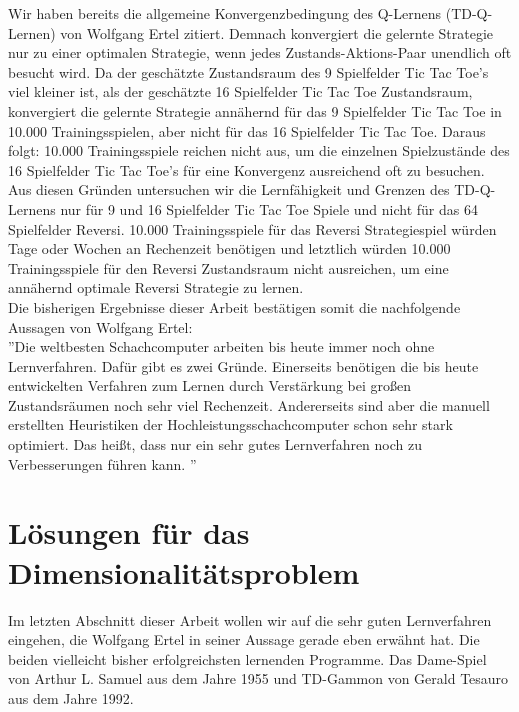 Wir haben bereits die allgemeine Konvergenzbedingung des Q-Lernens (TD-Q-Lernen) von Wolfgang Ertel zitiert. Demnach konvergiert die gelernte Strategie nur zu einer optimalen Strategie, wenn jedes Zustands-Aktions-Paar unendlich oft besucht wird. Da der geschätzte Zustandsraum des 9 Spielfelder Tic Tac Toe's viel kleiner ist, als der geschätzte 16 Spielfelder Tic Tac Toe Zustandsraum, konvergiert die gelernte Strategie annähernd für das 9 Spielfelder Tic Tac Toe in 10.000 Trainingsspielen, aber nicht für das 16 Spielfelder Tic Tac Toe. Daraus folgt: 10.000 Trainingsspiele reichen nicht aus, um die einzelnen Spielzustände des 16 Spielfelder Tic Tac Toe's für eine Konvergenz ausreichend oft zu besuchen. \\  

Aus diesen Gründen untersuchen wir die Lernfähigkeit und Grenzen des TD-Q-Lernens nur für 9 und 16 Spielfelder Tic Tac Toe Spiele und nicht für das 64 Spielfelder Reversi. 10.000 Trainingsspiele für das Reversi Strategiespiel würden Tage oder Wochen an Rechenzeit benötigen und letztlich würden 10.000 Trainingsspiele für den Reversi Zustandsraum nicht ausreichen, um eine annähernd optimale Reversi Strategie zu lernen. \\

Die bisherigen Ergebnisse dieser Arbeit bestätigen somit die nachfolgende Aussagen von Wolfgang Ertel: \\

''Die weltbesten Schachcomputer arbeiten bis heute immer noch ohne Lernverfahren. Dafür gibt es zwei Gründe. Einerseits benötigen die bis heute entwickelten Verfahren zum Lernen durch Verstärkung bei großen Zustandsräumen noch sehr viel Rechenzeit. Andererseits sind aber die manuell erstellten Heuristiken der Hochleistungsschachcomputer schon sehr stark optimiert. Das heißt, dass nur ein sehr gutes Lernverfahren noch zu Verbesserungen führen kann. \cite[120]{Ertel}''\\

\section{Lösungen für das Dimensionalitätsproblem}
\label{sec:Ausblick}
Im letzten Abschnitt dieser Arbeit wollen wir auf die sehr guten Lernverfahren eingehen, die Wolfgang Ertel in seiner Aussage gerade eben erwähnt hat. Die beiden vielleicht bisher erfolgreichsten lernenden Programme. Das Dame-Spiel von Arthur L. Samuel aus dem Jahre 1955 und TD-Gammon von Gerald Tesauro aus dem Jahre 1992. 

